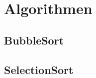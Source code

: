 \documentclass[./entry.tex]{subfiles}
\begin{document}
    \section{Algorithmen}
    \subsection{BubbleSort}
    
    \subsection{SelectionSort}
    
\end{document}
